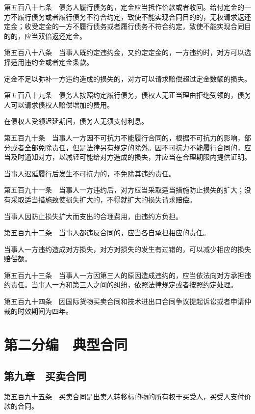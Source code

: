 \documentclass[UTF8,12pt,a4paper]{ctexbook}
\begin{document}
第五百八十七条　债务人履行债务的，定金应当抵作价款或者收回。给付定金的一方不履行债务或者履行债务不符合约定，致使不能实现合同目的的，无权请求返还定金；收受定金的一方不履行债务或者履行债务不符合约定，致使不能实现合同目的的，应当双倍返还定金。

第五百八十八条　当事人既约定违约金，又约定定金的，一方违约时，对方可以选择适用违约金或者定金条款。

定金不足以弥补一方违约造成的损失的，对方可以请求赔偿超过定金数额的损失。

第五百八十九条　债务人按照约定履行债务，债权人无正当理由拒绝受领的，债务人可以请求债权人赔偿增加的费用。

在债权人受领迟延期间，债务人无须支付利息。

第五百九十条　当事人一方因不可抗力不能履行合同的，根据不可抗力的影响，部分或者全部免除责任，但是法律另有规定的除外。因不可抗力不能履行合同的，应当及时通知对方，以减轻可能给对方造成的损失，并应当在合理期限内提供证明。

当事人迟延履行后发生不可抗力的，不免除其违约责任。

第五百九十一条　当事人一方违约后，对方应当采取适当措施防止损失的扩大；没有采取适当措施致使损失扩大的，不得就扩大的损失请求赔偿。

当事人因防止损失扩大而支出的合理费用，由违约方负担。

第五百九十二条　当事人都违反合同的，应当各自承担相应的责任。

当事人一方违约造成对方损失，对方对损失的发生有过错的，可以减少相应的损失赔偿额。

第五百九十三条　当事人一方因第三人的原因造成违约的，应当依法向对方承担违约责任。当事人一方和第三人之间的纠纷，依照法律规定或者按照约定处理。

第五百九十四条　因国际货物买卖合同和技术进出口合同争议提起诉讼或者申请仲裁的时效期间为四年。

\cleardoublepage
{}
\chapter*{第二分编　典型合同}

\section*{第九章　买卖合同}

第五百九十五条　买卖合同是出卖人转移标的物的所有权于买受人，买受人支付价款的合同。
\end{document}
